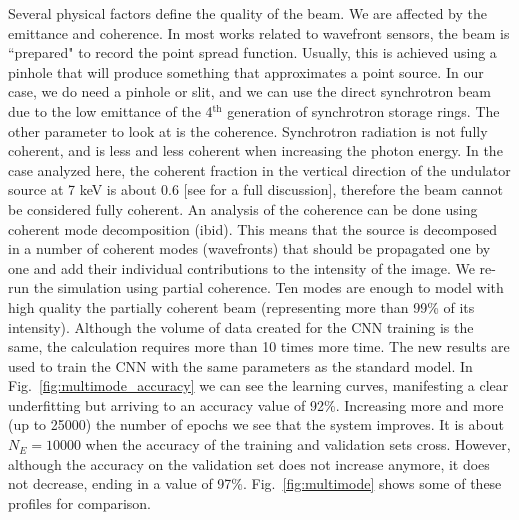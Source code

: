 \documentclass{iucr}
\begin{document}
Several physical factors define the quality of the beam. We are affected by the emittance and coherence. In most works related to wavefront sensors, the beam is ``prepared" to record the point spread function. Usually, this is achieved using a pinhole that will produce something that approximates a point source. In our case, we do need a pinhole or slit, and we can use the direct synchrotron beam due to the low emittance of the 4$^\text{th}$ generation of synchrotron storage rings. The other parameter to look at is the coherence. Synchrotron radiation is not fully coherent, and is less and less coherent when increasing the photon energy. In the case analyzed here, the coherent fraction in the vertical direction of the undulator source at 7 keV is about 0.6 [see \cite{multioptics} for a full discussion], therefore the beam cannot be considered fully coherent. An analysis of the coherence can be done using coherent mode decomposition (ibid). This means that the source is decomposed in a number of coherent modes (wavefronts) that should be propagated one by one and add their individual contributions to the intensity of the image. We re-run the simulation using partial coherence. Ten modes are enough to model with high quality the partially coherent beam (representing more than 99\% of its intensity). Although the volume of data created for the CNN training is the same, the calculation requires more than 10 times more time. The new results are used to train the CNN with the same parameters as the standard model. In Fig.~\ref{fig:multimode_accuracy} we can see the learning curves, manifesting a clear underfitting but arriving to an accuracy value of 92\%. Increasing more and more (up to 25000) the number of epochs we see that the system improves. It is about $N_E=10000$ when the accuracy of the training and validation sets cross. However, although the accuracy on the validation set does not increase anymore, it does not decrease, ending in a value of 97\%. Fig.~\ref{fig:multimode} shows some of these profiles for comparison.
\end{document}
